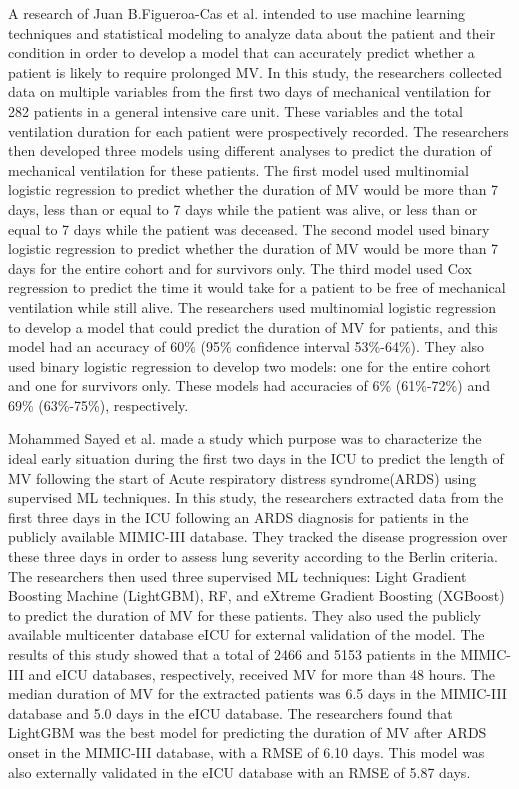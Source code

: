 \documentclass[journal]{IEEEtran} %
\begin{document}
A research of Juan B.Figueroa-Cas et al. \cite{Casas2015} intended to use machine learning techniques and statistical modeling to analyze data about the patient and their condition in order to develop a model that can accurately predict whether a patient is likely to require prolonged MV. In this study, the researchers collected data on multiple variables from the first two days of mechanical ventilation for 282 patients in a general intensive care unit. These variables and the total ventilation duration for each patient were prospectively recorded. The researchers then developed three models using different analyses to predict the duration of mechanical ventilation for these patients. The first model used multinomial logistic regression to predict whether the duration of MV would be more than 7 days, less than or equal to 7 days while the patient was alive, or less than or equal to 7 days while the patient was deceased. The second model used binary logistic regression to predict whether the duration of MV would be more than 7 days for the entire cohort and for survivors only. The third model used Cox regression to predict the time it would take for a patient to be free of mechanical ventilation while still alive. The researchers used multinomial logistic regression to develop a model that could predict the duration of MV for patients, and this model had an accuracy of 60\% (95\% confidence interval 53\%-64\%). They also used binary logistic regression to develop two models: one for the entire cohort and one for survivors only. These models had accuracies of 6\% (61\%-72\%) and 69\% (63\%-75\%), respectively.

Mohammed Sayed et al.\cite{Sayed2021} made a study which purpose was to characterize the ideal early situation during the first two days in the ICU to predict the length of MV following the start of Acute respiratory distress syndrome(ARDS) using supervised ML techniques. In this study, the researchers extracted data from the first three days in the ICU following an ARDS diagnosis for patients in the publicly available MIMIC-III database. They tracked the disease progression over these three days in order to assess lung severity according to the Berlin criteria. The researchers then used three supervised ML techniques: Light Gradient Boosting Machine (LightGBM), RF, and eXtreme Gradient Boosting (XGBoost) to predict the duration of MV for these patients. They also used the publicly available multicenter database eICU for external validation of the model. The results of this study showed that a total of 2466 and 5153 patients in the MIMIC-III and eICU databases, respectively, received MV for more than 48 hours. The median duration of MV for the extracted patients was 6.5 days in the MIMIC-III database and 5.0 days in the eICU database. The researchers found that LightGBM was the best model for predicting the duration of MV after ARDS onset in the MIMIC-III database, with a RMSE of 6.10 days. This model was also externally validated in the eICU database with an RMSE of 5.87 days.
\end{document}
